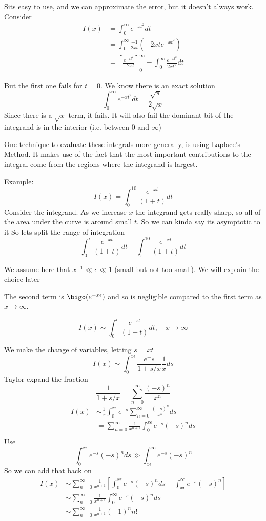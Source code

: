 \documentclass{X:/Documents/Coding/Latex/myassignment}
\begin{document}
Sits easy to use, and we can approximate the error, but it doesn't always work.
Consider
\begin{align*}
    I(x) &= \int_0^\infty e^{-xt^2}dt\\
    &= \int_0^\infty \frac{-1}{2xt} \left(-2xt e^{-xt^2}\right)\\
    &= \left[\frac{e^{-xt^2}}{-2xt}\right]_0^\infty - \int_0^\infty \frac{e^{-xt^2}}{2xt^2} dt
\end{align*}

But the first one fails for $t=0$.
We know there is an exact solution
\[\int_0^\infty e^{-xt^2} dt = \frac{\sqrt{\pi}}{2\sqrt{x}}\]
Since there is a $\sqrt{x}$ term, it fails. 
It will also fail the dominant bit of the integrand is in the interior (i.e. between 0 and $\infty$)

One technique to evaluate these integrals more generally, is using Laplace's Method. It makes use of the fact that the most important contributions to the integral come from the regions where the integrand is largest. 

Example:
\[I(x) = \int_0^{10} \frac{e^{-xt}}{(1+t)} dt\]
Consider the integrand. As we increase $x$ the integrand gets really sharp, so all of the area under the curve is around small $t$. So we can kinda say its asymptotic to it
So lets split the range of integration
\[ \int_0^\epsilon \frac{e^{-xt}}{(1+t)} dt +  \int_\epsilon^{10} \frac{e^{-xt}}{(1+t)} dt\]

We assume here that $x^{-1} \ll \epsilon \ll 1$ (small but not too small). We will explain the choice later

The second term is $\bigo(e^{-x\epsilon})$ and so is negligible compared to the first term as $x\to\infty$.

\[I(x) \sim \int_0^\epsilon \frac{e^{-xt}}{(1+t)} dt, \quad x\to\infty\]

We make the change of variables, letting $s =xt$
\[I(x) \sim \int_0^{x\epsilon} \frac{e^-s}{1+s/x} \frac1x ds\]
Taylor expand the fraction
\[\frac{1}{1+s/x} = \sum_{n=0}^\infty \frac{(-s)^n}{x^n}\]
\begin{align*}
    I(x) &\sim \frac1x \int_0^{x\epsilon} e^{-s} \sum_{n=0}^\infty \frac{(-s)^n}{x^n} ds\\
    &=\sum_{n=0}^\infty \frac1{x^{n+1}} \int_0^{x\epsilon} e^{-s}  (-s)^n ds\\
\end{align*}
Use
\[\int_0^{x\epsilon} e^{-s}(-s)^n ds \gg \int_{x\epsilon}^\infty e^{-s}(-s)^n\]
So we can add that back on 
\begin{align*}
    I(x) &\sim \sum_{n=0}^\infty \frac{1}{x^{n+1}} \left[\int_0^{x\epsilon} e^{-s}(-s)^n ds + \int_{x\epsilon}^\infty e^{-s}(-s)^n\right]\\
    &\sim \sum_{n=0}^\infty \frac{1}{x^{n+1}} \int_0^\infty e^{-s} (-s)^n ds\\
    &\sim \sum_{n=0}^\infty \frac{1}{x^{n+1}} (-1)^n  n!
\end{align*}
\end{document}
